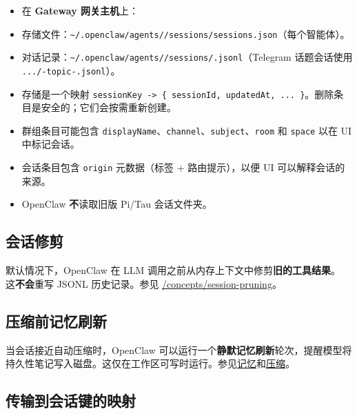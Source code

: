 \begin{itemize}
  \item 在 \textbf{Gateway 网关主机}上：
  \item 存储文件：\texttt{\textasciitilde{}/.openclaw/agents//sessions/sessions.json}（每个智能体）。
  \item 对话记录：\texttt{\textasciitilde{}/.openclaw/agents//sessions/.jsonl}（Telegram 话题会话使用 \texttt{.../-topic-.jsonl}）。
  \item 存储是一个映射 \texttt{sessionKey -> \{ sessionId, updatedAt, ... \}}。删除条目是安全的；它们会按需重新创建。
  \item 群组条目可能包含 \texttt{displayName}、\texttt{channel}、\texttt{subject}、\texttt{room} 和 \texttt{space} 以在 UI 中标记会话。
  \item 会话条目包含 \texttt{origin} 元数据（标签 + 路由提示），以便 UI 可以解释会话的来源。
  \item OpenClaw \textbf{不}读取旧版 Pi/Tau 会话文件夹。
\end{itemize}


\subsection{会话修剪}


默认情况下，OpenClaw 在 LLM 调用之前从内存上下文中修剪\textbf{旧的工具结果}。
这\textbf{不会}重写 JSONL 历史记录。参见 \href{/concepts/session-pruning}{/concepts/session-pruning}。

\subsection{压缩前记忆刷新}


当会话接近自动压缩时，OpenClaw 可以运行一个\textbf{静默记忆刷新}轮次，提醒模型将持久性笔记写入磁盘。这仅在工作区可写时运行。参见\href{/concepts/memory}{记忆}和\href{/concepts/compaction}{压缩}。

\subsection{传输到会话键的映射}


